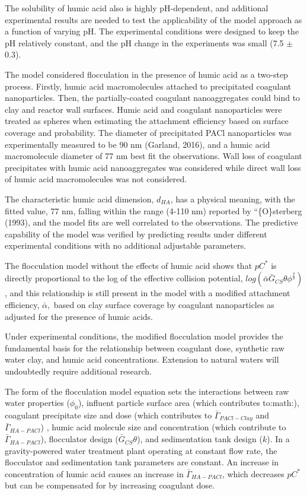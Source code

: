 \documentclass[letterpaper,10pt,english]{sphinxmanual}
\begin{document}
The solubility of humic acid also is highly pH-dependent, and additional experimental results are needed to test the applicability of the model approach as a function of varying pH. The experimental conditions were designed to keep the pH relatively constant, and the pH change in the experiments was small (7.5 \(\pm\) 0.3).

The model considered flocculation in the presence of humic acid as a two-step process. Firstly, humic acid macromolecules attached to precipitated coagulant nanoparticles. Then, the partially-coated coagulant nanoaggregates could bind to clay and reactor wall surfaces.  Humic acid and coagulant nanoparticles were treated as spheres when estimating the attachment efficiency based on surface coverage and probability. The diameter of precipitated PACl nanoparticles was experimentally measured to be 90 nm (Garland, 2016), and a humic acid macromolecule diameter of 77 nm best fit the observations. Wall loss of coagulant precipitates with humic acid nanoaggregates was considered while direct wall loss of humic acid macromolecules was not considered.

The characteristic humic acid dimension, \(d_{HA}\), has a physical meaning, with the fitted value, 77 nm, falling within the range (4-110 nm) reported by “\{O\}sterberg (1993), and the model fits are well correlated to the observations. The predictive capability of the model was verified by predicting results under different experimental conditions with no additional adjustable parameters.

The flocculation model without the effects of humic acid shows that \(pC^*\) is directly proportional to the log of the effective collision potential, \(log(\bar{\alpha }\bar G_{CS}\theta {\phi }^{\frac{2}{3}})\), and this relationship is still present in the model with a modified attachment efficiency, \(\bar{\alpha },\) based on clay surface coverage by coagulant nanoparticles as adjusted for the presence of humic acids.

Under experimental conditions, the modified flocculation model provides the fundamental basis for the relationship between coagulant dose, synthetic raw water clay, and humic acid concentrations.  Extension to natural waters will undoubtedly require additional research.

The form of the flocculation model equation sets the interactions between raw water properties (\({\phi }_0\)), influent particle surface area (which contributes to:math:), coagulant precipitate size and dose (which contributes to \({\bar{\Gamma}}_{PACl-Clay}\) and \({\bar{\Gamma}}_{HA-PACl}\)) , humic acid molecule size and concentration (which contribute to \({\bar{\Gamma}}_{HA-PACl}\)), flocculator design (\(\bar G_{CS}\theta\)), and sedimentation tank design (\(k\)). In a gravity-powered water treatment plant operating at constant flow rate, the flocculator and sedimentation tank parameters are constant. An increase in concentration of humic acid causes an increase in \({\bar{\Gamma}}_{HA-PACl}\), which decreases \(pC^*\) but can be compensated for by increasing coagulant dose.
\end{document}
